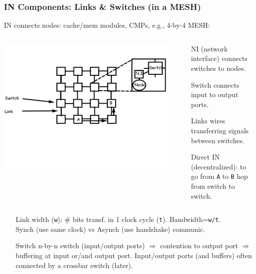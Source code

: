 \documentclass{beamer}
\newcommand{\emp}[1]{\textcolor{DikuRed}{ #1}}
\begin{document}
\begin{frame}[fragile,t]
\frametitle{IN Components: Links \& Switches (in a MESH)}

IN connects nodes: cache/mem modules, CMPs, e.g., 4-by-4 MESH:
\vspace{-3ex}

\begin{columns}
\includegraphics[width=47ex]{FigsInterconnect/Mesh}\pause
{}
\vspace{-6ex}
\begin{scriptsize}
\begin{itemize}
    \item[NI] (network interface) connects switches to nodes.
    \item[Switch] connects input to output ports.
    \item[Links] wires transferring signals between switches.
    \item[Direct] IN (decentralized): to go from {\tt A} to {\tt B} hop from switch to switch.
\end  {itemize}
\end{scriptsize}
\end{columns}
\vspace{-7ex}

\begin{itemize}
    \item[Link] \emp{width ({\tt w})}: \# bits transf. in 1 clock cycle ({\tt t}).
                \emp{Bandwidth={\tt w/t}}.\\
                \emp{Synch} (use same clock) vs \emp{Asynch} (use handshake) \emp{communic}.\medskip
    \item[Switch] n-by-n switch (input/output ports) $\Rightarrow$ contention to output port
                    $\Rightarrow$ buffering at input or/and output port.
                  Input/output ports (and buffers) often connected by a crossbar switch (later).
\end  {itemize}


\end{frame}
\end{document}
